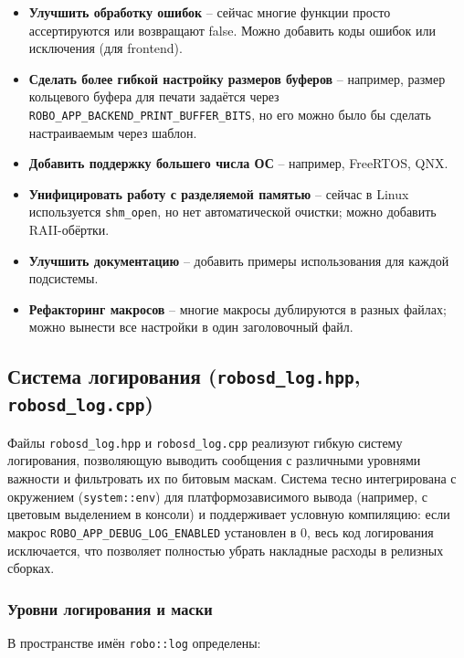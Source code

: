 \documentclass[a4paper,12pt]{article}
\begin{document}
\begin{itemize}
    \item \textbf{Улучшить обработку ошибок} -- сейчас многие функции просто ассертируются или возвращают false. Можно добавить коды ошибок или исключения (для frontend).
    \item \textbf{Сделать более гибкой настройку размеров буферов} -- например, размер кольцевого буфера для печати задаётся через \texttt{ROBO\_APP\_BACKEND\_PRINT\_BUFFER\_BITS}, но его можно было бы сделать настраиваемым через шаблон.
    \item \textbf{Добавить поддержку большего числа ОС} -- например, FreeRTOS, QNX.
    \item \textbf{Унифицировать работу с разделяемой памятью} -- сейчас в Linux используется \texttt{shm\_open}, но нет автоматической очистки; можно добавить RAII-обёртки.
    \item \textbf{Улучшить документацию} -- добавить примеры использования для каждой подсистемы.
    \item \textbf{Рефакторинг макросов} -- многие макросы дублируются в разных файлах; можно вынести все настройки в один заголовочный файл.
\end{itemize}

\subsection{Система логирования (\texttt{robosd\_log.hpp}, \texttt{robosd\_log.cpp})}

Файлы \texttt{robosd\_log.hpp} и \texttt{robosd\_log.cpp} реализуют гибкую систему логирования, позволяющую выводить сообщения с различными уровнями важности и фильтровать их по битовым маскам. Система тесно интегрирована с окружением (\texttt{system::env}) для платформозависимого вывода (например, с цветовым выделением в консоли) и поддерживает условную компиляцию: если макрос \texttt{ROBO\_APP\_DEBUG\_LOG\_ENABLED} установлен в 0, весь код логирования исключается, что позволяет полностью убрать накладные расходы в релизных сборках.

\subsubsection{Уровни логирования и маски}

В пространстве имён \texttt{robo::log} определены:
\end{document}
